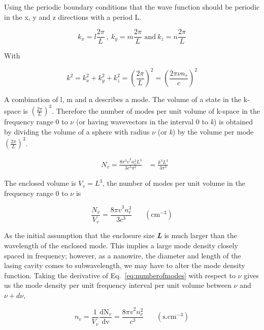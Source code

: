 Using the periodic boundary conditions that the wave function should be
periodic in the x, y and z directions with a period L.

\begin{equation}
  k_{x} = l\frac{2\pi}{L}\ ,\ k_{y} = m\frac{2\pi}{L}\text{\ and}\ k_{z} = n\frac{2\pi}{L}
\end{equation}

With

\begin{equation}
k^{2} = k_{x}^{2} + k_{y}^{2} + k_{z}^{2} = {(\frac{2\pi}{L})}^{2} = {(\frac{2\pi\nu n_{r}}{c})}^{2}
\end{equation}

A combination of l, m and n describes a mode. The volume of a state in
the k-space is \(\left( \frac{2\pi}{L} \right)^{3}\). Therefore the
number of modes per unit volume of k-space in the frequency range 0 to
\(\nu\) (or having wavevectors in the interval 0 to \emph{k}) is
obtained by dividing the volume of a sphere with radius \(\nu\) (or
\emph{k}) by the volume per mode\(\left( \frac{2\pi}{L} \right)^{3}\).

\begin{eqnarray}
   & N_{v} = \frac{{8\pi^{3}v}^{3}n_{r}^{3}L^{3}}{3c^{3}\pi^{2}}
   & = \frac{k^{3}L^{3}}{3\pi^{2}}
\end{eqnarray}

The enclosed volume is \(V_{v} = L^{3}\), the number of modes per unit
volume in the frequency range 0 to \(\nu\) is

\begin{equation}
  \frac{N_{v}}{V_{v}} = \frac{{8\pi v}^{3}n_{r}^{3}}{3c^{3}}\ \ \ \ \ \ \ \ (\text{cm}^{- 3})
  \label{eq:numberofmodes}
\end{equation}

As the initial assumption that the enclosure size \emph{\textbf{L}} is much
larger than the wavelength of the enclosed mode. This implies a large mode
density closely spaced in frequency; however, as a nanowire, the diameter and
length of the lasing cavity comes to subwavelength, we may have to alter the
mode density function. Taking the derivative of Eq.~\ref{eq:numberofmodes} with
respect to \(\nu\) gives us the mode density per unit frequency interval per
unit volume between \(\nu\) and \(\nu + d\nu\),

\begin{equation}
n_{v} = \frac{1}{V_{v}}\frac{\text{dN}_{v}}{\text{dv}} = \frac{{8\pi v}^{2}n_{r}^{2}}{c^{3}}\ \ \ \ \ \ \ \ (\text{s.cm}^{- 3})
\end{equation}

